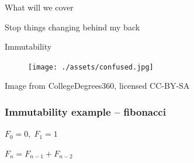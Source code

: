 \documentclass[aspectratio=169]{beamer}
\begin{document}
\begin{frame}
  \begin{center}
    \Huge What will we cover
  \end{center}
\end{frame}

\begin{frame}
  \begin{center}
    \Huge Stop things changing behind my back
  \end{center}
\end{frame}

\begin{frame}
  \begin{center}
    \Huge Immutability
  \end{center}
\end{frame}

\begin{frame}
  \begin{figure}[p]
    \texttt{[image: ./assets/confused.jpg]}
  \end{figure}
  \tiny Image from CollegeDegrees360, licensed CC-BY-SA
\end{frame}

\begin{frame}
  \frametitle{Immutability example -- fibonacci}
  $ F_0 = 0,\; F_1 = 1$

  $F_n = F_{n-1} + F_{n-2}$
\end{frame}
\end{document}
